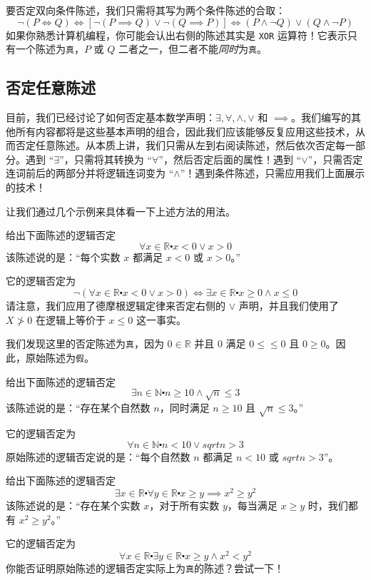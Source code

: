 要否定双向条件陈述，我们只需将其写为两个条件陈述的合取：
\[\neg (P \iff Q) \iff [\neg (P \implies Q) \lor \neg (Q \implies P)] \iff (P \land \neg Q) \lor (Q \land \neg P)\]
如果你熟悉计算机编程，你可能会认出右侧的陈述其实是 \verb|XOR| 运算符！它表示只有一个陈述为\verb|真|，$P$ 或 $Q$ 二者之一，但二者不能\emph{同时}为\verb|真|。

\subsection{否定任意陈述}

目前，我们已经讨论了如何否定基本数学声明：$\exists, \forall, \land , \lor$ 和 $\implies$。我们编写的其他所有内容都将是这些基本声明的组合，因此我们应该能够反复应用这些技术，从而否定任意陈述。从本质上讲，我们只需从左到右阅读陈述，然后依次否定每一部分。遇到 ``$\exists$''，只需将其转换为 ``$\forall$''，然后否定后面的属性！遇到 ``$\lor$''，只需否定连词前后的两部分并将逻辑连词变为 ``$\land$''！遇到条件陈述，只需应用我们上面展示的技术！

让我们通过几个示例来具体看一下上述方法的用法。

\begin{example}
    给出下面陈述的逻辑否定
    \[\forall x \in \mathbb{R} \centerdot x < 0 \lor x > 0\]
    该陈述说的是：``每个实数 $x$ 都满足 $x < 0$ 或 $x > 0$。''

    它的逻辑否定为
    \[\neg (\forall x \in \mathbb{R} \centerdot x < 0 \lor x > 0) \iff \exists x \in \mathbb{R} \centerdot x \ge 0 \land x \le 0\]
    请注意，我们应用了德摩根逻辑定律来否定右侧的 $\lor$ 声明，并且我们使用了 $X \ngtr 0$ 在逻辑上等价于 $x \le 0$ 这一事实。

    我们发现这里的否定陈述为\verb|真|，因为 $0 \in \mathbb{R}$ 并且 $0$ 满足 $0≤ \le 0$ 且 $0 \ge 0$。因此，原始陈述为\verb|假|。
\end{example}

\begin{example}
    给出下面陈述的逻辑否定
    \[\exists n \in \mathbb{N} \centerdot n \ge 10 \land \sqrt{n} \le 3\]
    该陈述说的是：``存在某个自然数 $n$，同时满足 $n \ge 10$ 且 $\sqrt{n} \le 3$。''

    它的逻辑否定为
    \[\forall n \in \mathbb{N} \centerdot n < 10 \lor sqrt{n} > 3\]
    原始陈述的逻辑否定说的是：``每个自然数 $n$ 都满足 $n < 10$ 或 $sqrt{n} > 3$''。
\end{example}

\begin{example}
    给出下面陈述的逻辑否定
    \[\exists x \in \mathbb{R} \centerdot \forall y \in \mathbb{R} \centerdot x \ge y \implies x^2 \ge y^2\]
    该陈述说的是：``存在某个实数 $x$，对于所有实数 $y$，每当满足 $x \ge y$ 时，我们都有 $x^2 \ge y^2$。''

    它的逻辑否定为
    \[\forall x \in \mathbb{R} \centerdot \exists y \in \mathbb{R} \centerdot x \ge y \land x^2 < y^2\]
    你能否证明原始陈述的逻辑否定实际上为\verb|真|的陈述？尝试一下！
\end{example}

